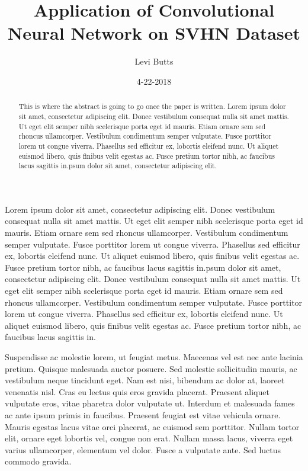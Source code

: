 \documentclass{article}
\title{Application of Convolutional Neural Network on SVHN Dataset}
\date{4-22-2018}
\author{Levi Butts}
\begin{document}
	\maketitle
	\begin{abstract}
		This is  where the abstract is going to go once the paper is written. Lorem ipsum dolor sit amet, consectetur adipiscing elit. Donec vestibulum consequat nulla sit amet mattis. Ut eget elit semper nibh scelerisque porta eget id mauris. Etiam ornare sem sed rhoncus ullamcorper. Vestibulum condimentum semper vulputate. Fusce porttitor lorem ut congue viverra. Phasellus sed efficitur ex, lobortis eleifend nunc. Ut aliquet euismod libero, quis finibus velit egestas ac. Fusce pretium tortor nibh, ac faucibus lacus sagittis in.psum dolor sit amet, consectetur adipiscing elit.
	\end{abstract}
	\twocolumn
	
Lorem ipsum dolor sit amet, consectetur adipiscing elit. Donec vestibulum consequat nulla sit amet mattis. Ut eget elit semper nibh scelerisque porta eget id mauris. Etiam ornare sem sed rhoncus ullamcorper. Vestibulum condimentum semper vulputate. Fusce porttitor lorem ut congue viverra. Phasellus sed efficitur ex, lobortis eleifend nunc. Ut aliquet euismod libero, quis finibus velit egestas ac. Fusce pretium tortor nibh, ac faucibus lacus sagittis in.psum dolor sit amet, consectetur adipiscing elit. Donec vestibulum consequat nulla sit amet mattis. Ut eget elit semper nibh scelerisque porta eget id mauris. Etiam ornare sem sed rhoncus ullamcorper. Vestibulum condimentum semper vulputate. Fusce porttitor lorem ut congue viverra. Phasellus sed efficitur ex, lobortis eleifend nunc. Ut aliquet euismod libero, quis finibus velit egestas ac. Fusce pretium tortor nibh, ac faucibus lacus sagittis in.




Suspendisse ac molestie lorem, ut feugiat metus. Maecenas vel est nec ante lacinia pretium. Quisque malesuada auctor posuere. Sed molestie sollicitudin mauris, ac vestibulum neque tincidunt eget. Nam est nisi, bibendum ac dolor at, laoreet venenatis nisl. Cras eu lectus quis eros gravida placerat. Praesent aliquet vulputate eros, vitae pharetra dolor vulputate ut. Interdum et malesuada fames ac ante ipsum primis in faucibus. Praesent feugiat est vitae vehicula ornare. Mauris egestas lacus vitae orci placerat, ac euismod sem porttitor. Nullam tortor elit, ornare eget lobortis vel, congue non erat. Nullam massa lacus, viverra eget varius ullamcorper, elementum vel dolor. Fusce a vulputate ante. Sed luctus commodo gravida.
\end{document}

